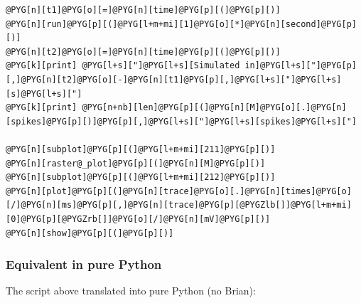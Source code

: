 \documentclass[letterpaper,10pt,english]{manual}
\begin{document}
\begin{Verbatim}[commandchars=@\[\]]
@PYG[n][t1]@PYG[o][=]@PYG[n][time]@PYG[p][(]@PYG[p][)]
@PYG[n][run]@PYG[p][(]@PYG[l+m+mi][1]@PYG[o][*]@PYG[n][second]@PYG[p][)]
@PYG[n][t2]@PYG[o][=]@PYG[n][time]@PYG[p][(]@PYG[p][)]
@PYG[k][print] @PYG[l+s]["]@PYG[l+s][Simulated in]@PYG[l+s]["]@PYG[p][,]@PYG[n][t2]@PYG[o][-]@PYG[n][t1]@PYG[p][,]@PYG[l+s]["]@PYG[l+s][s]@PYG[l+s]["]
@PYG[k][print] @PYG[n+nb][len]@PYG[p][(]@PYG[n][M]@PYG[o][.]@PYG[n][spikes]@PYG[p][)]@PYG[p][,]@PYG[l+s]["]@PYG[l+s][spikes]@PYG[l+s]["]

@PYG[n][subplot]@PYG[p][(]@PYG[l+m+mi][211]@PYG[p][)]
@PYG[n][raster@_plot]@PYG[p][(]@PYG[n][M]@PYG[p][)]
@PYG[n][subplot]@PYG[p][(]@PYG[l+m+mi][212]@PYG[p][)]
@PYG[n][plot]@PYG[p][(]@PYG[n][trace]@PYG[o][.]@PYG[n][times]@PYG[o][/]@PYG[n][ms]@PYG[p][,]@PYG[n][trace]@PYG[p][@PYGZlb[]]@PYG[l+m+mi][0]@PYG[p][@PYGZrb[]]@PYG[o][/]@PYG[n][mV]@PYG[p][)]
@PYG[n][show]@PYG[p][(]@PYG[p][)]
\end{Verbatim}


\subsubsection{Equivalent in pure Python}

The script above translated into pure Python (no Brian):
\end{document}
